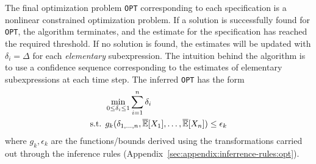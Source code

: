 The final optimization problem \texttt{OPT} corresponding to each specification is a nonlinear constrained optimization problem.
If a solution is successfully found for \texttt{OPT}, the algorithm terminates, and the estimate for the specification has reached the required threshold.
If no solution is found, the estimates will be updated with $\delta_i = \Delta$ for each \textit{elementary} subexpression.
The intuition behind the algorithm is to use a confidence sequence corresponding to the estimates of elementary subexpressions at each time step.
The inferred \texttt{OPT} has the form
\begin{align}
    \label{eq:optimization}
    \begin{split}
        &\min_{0 \leq \delta_i \leq 1} \sum_{i=1}^{n}\delta_i  \\
        \text{s.t. } &g_k(\delta_{1, \dots, n}, \overline{\mathbb{E}}[X_1], \dots, \overline{\mathbb{E}}[X_n]) \leq \epsilon_k\\
    \end{split}
\end{align}
where $g_k, \epsilon_k$ are the functions/bounds derived using the transformations carried out through the inference rules (Appendix~\ref{sec:appendix:inferrence-rules:opt}).

